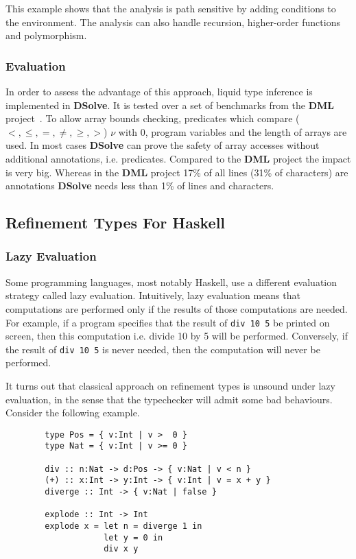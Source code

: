 \documentclass[a4paper,UKenglish]{lipics-v2016}
\begin{document}
This example shows that the analysis is path sensitive by adding conditions to the environment.
The analysis can also handle recursion, higher-order functions and polymorphism.

\subsubsection{Evaluation}

In order to assess the advantage of this approach, liquid type inference is implemented in \textbf{DSolve}.
It is tested over a set of benchmarks from the \textbf{DML} project~\cite{Xi:1998:EAB}.
To allow array bounds checking, predicates which compare ($<, \le, =, \neq, \geq, >$) $\nu$ with 0, program variables and the length of arrays are used.
In most cases \textbf{DSolve} can prove the safety of array accesses without additional annotations, i.e. predicates.
Compared to the \textbf{DML} project the impact is very big.
Whereas in the \textbf{DML} project 17\% of all lines (31\% of characters) are annotations \textbf{DSolve} needs less than 1\% of lines and characters.


  \subsection{Refinement Types For Haskell}

    \subsubsection{Lazy Evaluation}

      Some programming languages, most notably Haskell, use a different
      evaluation strategy called lazy evaluation.  Intuitively, lazy evaluation
      means that computations are performed only if the results of those
      computations are needed.  For example, if a program specifies that the
      result of \texttt{div 10 5} be printed on screen, then this computation
      i.e. divide 10 by 5 will be performed.  Conversely, if the result of
      \texttt{div 10 5} is never needed, then the computation will never be
      performed.

      It turns out that classical approach on refinement types is unsound under
      lazy evaluation, in the sense that the typechecker will admit some bad
      behaviours.  Consider the following example.
      \begin{verbatim}
        type Pos = { v:Int | v >  0 }
        type Nat = { v:Int | v >= 0 }

        div :: n:Nat -> d:Pos -> { v:Nat | v < n } 
        (+) :: x:Int -> y:Int -> { v:Int | v = x + y }
        diverge :: Int -> { v:Nat | false } 

        explode :: Int -> Int
        explode x = let n = diverge 1 in 
                    let y = 0 in 
                    div x y
      \end{verbatim}
\end{document}
